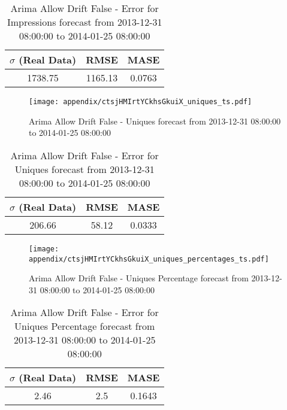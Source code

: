 \begin{table}[H]
\centering
\footnotesize
\begin{tabular}{ccc}
$\sigma$ (Real Data) & RMSE & MASE   \\ \hline
1738.75 & 1165.13 & 0.0763 \\
\end{tabular}

\vspace{0.5cm}

\caption{
Arima Allow Drift False - Error for Impressions forecast from 2013-12-31 08:00:00 to 2014-01-25 08:00:00}
\end{table}

\begin{figure}[H] \begin{center} \leavevmode
\texttt{[image: appendix/ctsjHMIrtYCkhsGkuiX\_uniques\_ts.pdf]} \caption{
Arima Allow Drift False - Uniques forecast from 2013-12-31 08:00:00 to 2014-01-25 08:00:00} \label{fig:appendix/ctsjHMIrtYCkhsGkuiX_uniques_ts.pdf} \end{center}
\end{figure}

\begin{table}[H]
\centering
\footnotesize
\begin{tabular}{ccc}
$\sigma$ (Real Data) & RMSE & MASE   \\ \hline
206.66 & 58.12 & 0.0333 \\
\end{tabular}

\vspace{0.5cm}

\caption{
Arima Allow Drift False - Error for Uniques forecast from 2013-12-31 08:00:00 to 2014-01-25 08:00:00}
\end{table}

\begin{figure}[H] \begin{center} \leavevmode
\texttt{[image: appendix/ctsjHMIrtYCkhsGkuiX\_uniques\_percentages\_ts.pdf]} \caption{
Arima Allow Drift False - Uniques Percentage forecast from 2013-12-31 08:00:00 to 2014-01-25 08:00:00} \label{fig:appendix/ctsjHMIrtYCkhsGkuiX_uniques_percentages_ts.pdf} \end{center}
\end{figure}

\begin{table}[H]
\centering
\footnotesize
\begin{tabular}{ccc}
$\sigma$ (Real Data) & RMSE & MASE   \\ \hline
2.46 & 2.5 & 0.1643 \\
\end{tabular}

\vspace{0.5cm}

\caption{
Arima Allow Drift False - Error for Uniques Percentage forecast from 2013-12-31 08:00:00 to 2014-01-25 08:00:00}
\end{table}

